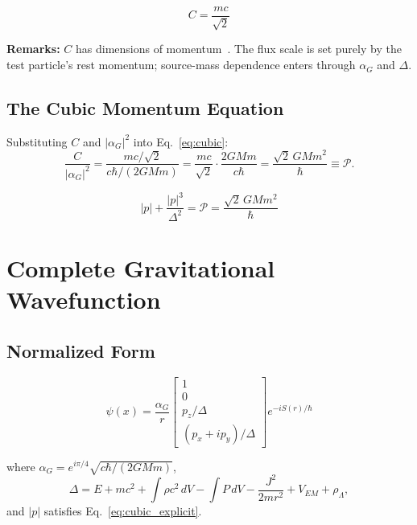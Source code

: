 \documentclass[11pt,a4paper]{article}
\theoremstyle{definition}
\theoremstyle{remark}
\begin{document}
	\begin{equation}
		\boxed{C = \frac{mc}{\sqrt{2}}}
		\label{eq:C_final}
	\end{equation}
	
	\textbf{Remarks:}  $C$ has dimensions of momentum~\checkmark.  The flux scale is set purely by the test particle's rest momentum; source-mass dependence enters through $\alpha_G$ and $\Delta$.
	
	\subsection{The Cubic Momentum Equation}
	
	Substituting $C$ and $|\alpha_G|^2$ into Eq.~\eqref{eq:cubic}:
	\begin{equation}
		\frac{C}{|\alpha_G|^2} = \frac{mc/\sqrt{2}}{c\hbar/(2GMm)} = \frac{mc}{\sqrt{2}}\cdot\frac{2GMm}{c\hbar} = \frac{\sqrt{2}\,GMm^2}{\hbar} \equiv \mathcal{P}.
	\end{equation}
	
	\begin{equation}
		\boxed{|p| + \frac{|p|^3}{\Delta^2} = \mathcal{P} = \frac{\sqrt{2}\,GMm^2}{\hbar}}
		\label{eq:cubic_explicit}
	\end{equation}
	
	\section{Complete Gravitational Wavefunction}
	
	\subsection{Normalized Form}
	
	\begin{equation}
		\boxed{\psi(x) = \frac{\alpha_G}{r}\begin{bmatrix}1\\0\\ p_z/\Delta\\ (p_x+ip_y)/\Delta\end{bmatrix}e^{-iS(r)/\hbar}}
		\label{eq:normalized_wavefunction}
	\end{equation}
	
	where $\alpha_G = e^{i\pi/4}\sqrt{c\hbar/(2GMm)}$,
	\begin{equation}
		\Delta = E + mc^2 + \int\rho c^2\,dV - \int P\,dV - \frac{J^2}{2mr^2} + V_{EM} + \rho_\Lambda,
	\end{equation}
	and $|p|$ satisfies Eq.~\eqref{eq:cubic_explicit}.
	
\end{document}

